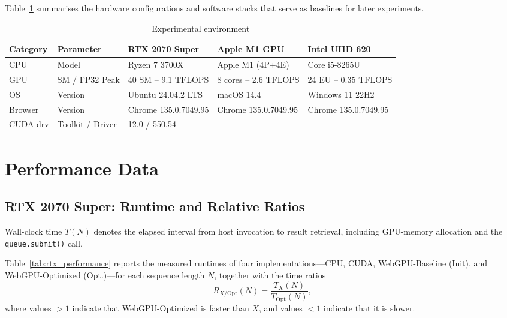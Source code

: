\documentclass[PhD]{PHlab-thesis}
\begin{document}
Table~\ref{tab:exp_env} summarises the hardware configurations and software stacks \cite{NVIDIA2019-rtx2070,Apple2020-m1,Intel2018-uhd620} that serve as baselines for later experiments.

\begin{table}[htbp]
  \centering
  \caption{Experimental environment}
  \label{tab:exp_env}
  \setlength{\tabcolsep}{8pt}
  \renewcommand{\arraystretch}{1.4}
  \small
  \begin{tabularx}{\textwidth}{@{}lX X X X@{}}
    \toprule
    Category & Parameter & RTX 2070 Super & Apple M1 GPU & Intel UHD 620 \\
    \midrule
    CPU      & Model                 & Ryzen 7 3700X          & Apple M1 (4P+4E)   & Core i5-8265U \\
    GPU      & SM / FP32 Peak        & 40 SM – 9.1 TFLOPS     & 8 cores – 2.6 TFLOPS & 24 EU – 0.35 TFLOPS \\
    OS       & Version               & Ubuntu 24.04.2 LTS     & macOS 14.4          & Windows 11 22H2 \\
    Browser  & Version               & Chrome 135.0.7049.95   & Chrome 135.0.7049.95 & Chrome 135.0.7049.95 \\
    CUDA drv & Toolkit / Driver      & 12.0 / 550.54          & —                   & — \\
    \bottomrule
  \end{tabularx}
\end{table}


\section{Performance Data}

\subsection{RTX 2070 Super: Runtime and Relative Ratios}
Wall-clock time $T(N)$ denotes the elapsed interval from host invocation to
result retrieval, including GPU-memory allocation and the
\texttt{queue.submit()} call.

Table~\ref{tab:rtx_performance} reports the measured runtimes of four
implementations—CPU, CUDA, WebGPU-Baseline (Init), and WebGPU-Optimized
(Opt.)—for each sequence length $N$, together with the time ratios
\[
  R_{X/\mathrm{Opt}}(N)=\frac{T_{X}(N)}{T_{\mathrm{Opt}}(N)},
\]
where values $>1$ indicate that WebGPU-Optimized is faster than
$X$, and values $<1$ indicate that it is slower.
\end{document}
